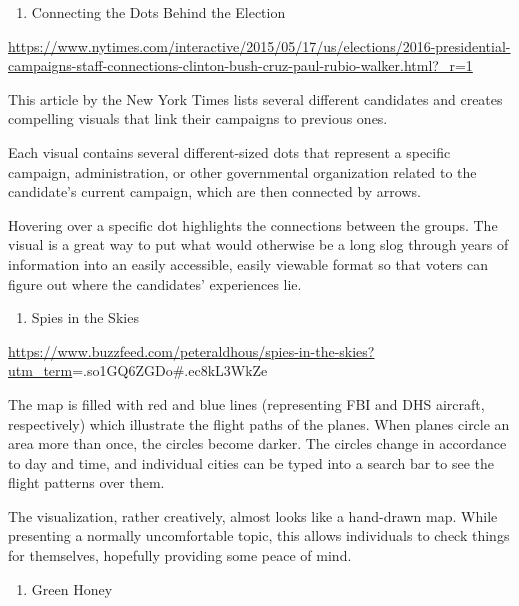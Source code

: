 \documentclass[]{book}
\providecommand{\tightlist}{%
  \setlength{\itemsep}{0pt}\setlength{\parskip}{0pt}}
\theoremstyle{definition}
\theoremstyle{definition}
\theoremstyle{definition}
\theoremstyle{remark}
\begin{document}
\begin{enumerate}
\def\labelenumi{\arabic{enumi}.}
\tightlist
\item
  Connecting the Dots Behind the Election
\end{enumerate}

\url{https://www.nytimes.com/interactive/2015/05/17/us/elections/2016-presidential-campaigns-staff-connections-clinton-bush-cruz-paul-rubio-walker.html?_r=1}

This article by the New York Times lists several different candidates
and creates compelling visuals that link their campaigns to previous
ones.

Each visual contains several different-sized dots that represent a
specific campaign, administration, or other governmental organization
related to the candidate's current campaign, which are then connected by
arrows.

Hovering over a specific dot highlights the connections between the
groups. The visual is a great way to put what would otherwise be a long
slog through years of information into an easily accessible, easily
viewable format so that voters can figure out where the candidates'
experiences lie.

\begin{enumerate}
\def\labelenumi{\arabic{enumi}.}
\setcounter{enumi}{1}
\tightlist
\item
  Spies in the Skies
\end{enumerate}

\url{https://www.buzzfeed.com/peteraldhous/spies-in-the-skies?utm_term}=.so1GQ6ZGDo\#.ec8kL3WkZe

The map is filled with red and blue lines (representing FBI and DHS
aircraft, respectively) which illustrate the flight paths of the planes.
When planes circle an area more than once, the circles become darker.
The circles change in accordance to day and time, and individual cities
can be typed into a search bar to see the flight patterns over them.

The visualization, rather creatively, almost looks like a hand-drawn
map. While presenting a normally uncomfortable topic, this allows
individuals to check things for themselves, hopefully providing some
peace of mind.

\begin{enumerate}
\def\labelenumi{\arabic{enumi}.}
\setcounter{enumi}{2}
\tightlist
\item
  Green Honey
\end{enumerate}
\end{document}
